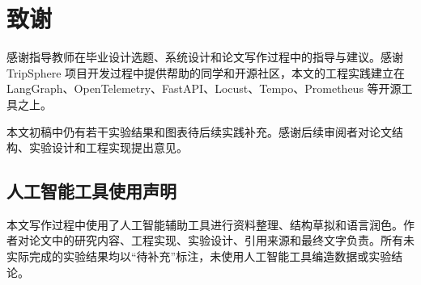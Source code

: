 \chapter*{致谢}

感谢指导教师在毕业设计选题、系统设计和论文写作过程中的指导与建议。感谢 TripSphere 项目开发过程中提供帮助的同学和开源社区，本文的工程实践建立在 LangGraph、OpenTelemetry、FastAPI、Locust、Tempo、Prometheus 等开源工具之上。

本文初稿中仍有若干实验结果和图表待后续实践补充。感谢后续审阅者对论文结构、实验设计和工程实现提出意见。

\section*{人工智能工具使用声明}

本文写作过程中使用了人工智能辅助工具进行资料整理、结构草拟和语言润色。作者对论文中的研究内容、工程实现、实验设计、引用来源和最终文字负责。所有未实际完成的实验结果均以“待补充”标注，未使用人工智能工具编造数据或实验结论。
